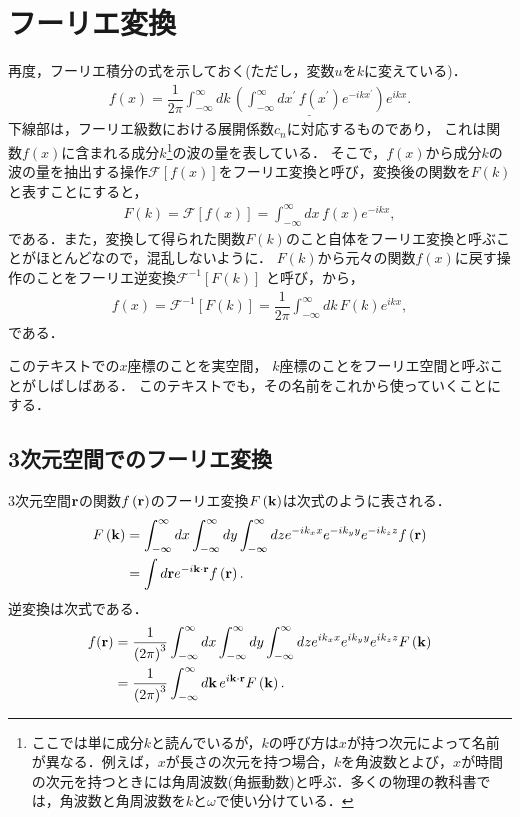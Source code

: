 \section{フーリエ変換}
%
再度，フーリエ積分の式を示しておく(ただし，変数$u$を$k$に変えている)．
\begin{align}
 f\left(x\right) = \dfrac{1}{2\pi}\int_{-\infty}^{\infty}dk\,
                    \underline{\left(\int_{-\infty}^{\infty}dx^{\prime}\,f\left(x^{\prime}\right)e^{-ikx^{\prime}}\right)}e^{ikx}. \label{fourier_integral_02}
\end{align}
下線部は，フーリエ級数における展開係数$c_n$に対応するものであり，
これは関数$f(x)$に含まれる成分$k$\footnote{ここでは単に成分$k$と読んでいるが，$k$の呼び方は$x$が持つ次元によって名前が異なる．例えば，$x$が長さの次元を持つ場合，$k$を角波数とよび，$x$が時間の次元を持つときには角周波数(角振動数)と呼ぶ．多くの物理の教科書では，角波数と角周波数を$k$と$\omega$で使い分けている．}の波の量を表している．
そこで，$f(x)$から成分$k$の波の量を抽出する操作$\mathcal{F}[f(x)]$をフーリエ変換と呼び，変換後の関数を$F(k)$と表すことにすると，
\begin{align}
 F\left(k\right) = \mathcal{F}\left[f\left(x\right)\right] = \int_{-\infty}^{\infty}dx\, f\left(x\right)e^{-ikx},
\end{align}
である．また，変換して得られた関数$F\left(k\right)$のこと自体をフーリエ変換と呼ぶことがほとんどなので，混乱しないように．
$F\left(k\right)$から元々の関数$f\left(x\right)$に戻す操作のことをフーリエ逆変換$\mathcal{F}^{-1}\left[F(k)\right]$
と呼び，から，
\begin{align}
 f\left(x\right) = \mathcal{F}^{-1}\left[F\left(k\right)\right]
 = \dfrac{1}{2\pi} \int_{-\infty}^{\infty}dk\, F\left(k\right)e^{ikx},
\end{align}
である．

このテキストでの$x$座標のことを実空間，
$k$座標のことをフーリエ空間と呼ぶことがしばしばある．
このテキストでも，その名前をこれから使っていくことにする．
%
\subsection{3次元空間でのフーリエ変換}
%
3次元空間${\bf r}$の関数$f\left({\bf r}\right)$のフーリエ変換$F\left({\bf k}\right)$は次式のように表される．
\begin{align}
 F\left({\bf k}\right) &= \int_{-\infty}^{\infty}dx\int_{-\infty}^{\infty}dy \int_{-\infty}^{\infty}dz
                         e^{-ik_x x}e^{-ik_y y}e^{-ik_z z} f\left({\bf r}\right) \notag \\
                       &= \int d{\bf r}e^{-i{\bf k}\cdot {\bf r}}f\left({\bf r}\right).
\end{align}
%
逆変換は次式である．
\begin{align}
 f({\bf r}) &= \dfrac{1}{\left(2\pi\right)^3} \int_{-\infty}^{\infty}dx\int_{-\infty}^{\infty}dy \int_{-\infty}^{\infty}dz
              e^{ik_x x}e^{ik_y y}e^{ik_z z} F\left({\bf k}\right) \notag \\
            &=  \dfrac{1}{\left(2\pi\right)^3} \int_{-\infty}^{\infty}d{\bf k}\,e^{i{\bf k}\cdot {\bf r}} F\left({\bf k}\right).
\end{align}
%
